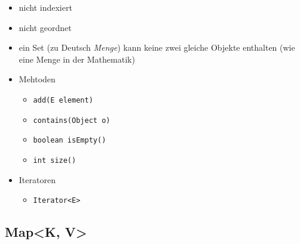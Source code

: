 \begin{itemize}
	\item nicht indexiert
	\item nicht geordnet
	\item ein Set (zu Deutsch \textit{Menge}) kann keine zwei gleiche 
		Objekte enthalten (wie eine Menge in der Mathematik)
	\item Mehtoden
		\begin{itemize}
			\item \lstinline{add(E element)}
			\item \lstinline{contains(Object o)}
			\item \lstinline{boolean isEmpty()}
			\item \lstinline{int size()}
		\end{itemize}
	\item Iteratoren
		\begin{itemize}
			\item \lstinline{Iterator<E>}
		\end{itemize}
\end{itemize}

\subsection{Map<K, V>}

